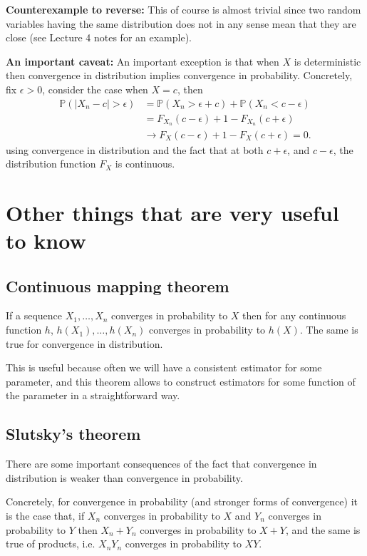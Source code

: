 \documentclass[twoside,12pt]{article}
\begin{document}
{\bf Counterexample to reverse: } This of course is almost trivial since two random variables having the same distribution does not in any sense mean that they are close (see Lecture 4 notes for an example).

{\bf An important caveat: } An important exception is that when $X$ is deterministic then convergence in distribution implies convergence in probability. Concretely, fix $\epsilon > 0$, consider the case when $X = c$, then 
\begin{align*}
\mathbb{P}(|X_n - c| > \epsilon) &= \mathbb{P}(X_n > \epsilon + c ) +  \mathbb{P}(X_n < c - \epsilon) \\
&= F_{X_n}(c - \epsilon) + 1 - F_{X_n}(c + \epsilon) \\
&\rightarrow F_X(c - \epsilon) + 1 - F_X(c + \epsilon ) = 0.
\end{align*}
using convergence in distribution and the fact that at both $c + \epsilon$, and $c - \epsilon$, the distribution function $F_X$ is continuous.

\section{Other things that are very useful to know}

\subsection{Continuous mapping theorem}
If a sequence $X_1,\ldots,X_n$ converges in probability to $X$ then 
for any continuous function $h$, 
$h(X_1), \ldots, h(X_n)$ converges in probability to $h(X)$. The same is true for convergence in distribution.

This is useful because often we will have a consistent estimator for some parameter, and this theorem allows to construct estimators for some function of the parameter in a straightforward way.

\subsection{Slutsky's theorem}
There are some important consequences of the fact that convergence in distribution is weaker than convergence in probability. 

Concretely, for convergence in probability (and stronger forms of convergence) it is the case that,
if $X_n$ converges in probability to $X$ and $Y_n$ converges in probability to $Y$ then $X_n + Y_n$ converges in probability to $X+Y$, and the same is true of products, i.e. $X_nY_n$ converges in probability to $XY$.
\end{document}
